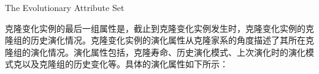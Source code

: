 
{The Evolutionary Attribute Set}

克隆变化实例的最后一组属性是，截止到克隆变化实例发生时，克隆变化实例的克隆组的历史演化情况。克隆变化实例的演化属性从克隆家系的角度描述了其所在克隆组的演化情况。演化属性包括，克隆寿命、历史演化模式、上次演化时的演化模式克以及克隆组的历史变化等。具体的演化属性如下所示：

